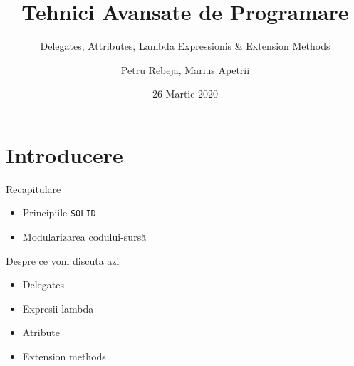 \documentclass[presentation]{beamer}
\author{Petru Rebeja, Marius Apetrii}
\date{26 Martie 2020}
\title{Tehnici Avansate de Programare}
\subtitle{Delegates,  Attributes, Lambda Expressionis \& Extension Methods}
\institute[UAIC]{Facultatea de Matematică\\Universitatea Alexandru Ioan Cuza, Iași}
\begin{document}
\maketitle
\section{Introducere}
\label{sec:org4c954e2}
\begin{frame}[label={sec:org39c3f51},fragile]{Recapitulare}
 \begin{itemize}
\item Principiile \texttt{SOLID}
\item Modularizarea codului-sursă
\end{itemize}
\end{frame}
\begin{frame}[label={sec:org358cca2}]{Despre ce vom discuta azi}
\begin{itemize}
\item Delegates
\item Expresii lambda
\item Atribute
\item Extension methods
\end{itemize}
\end{frame}
\end{document}
